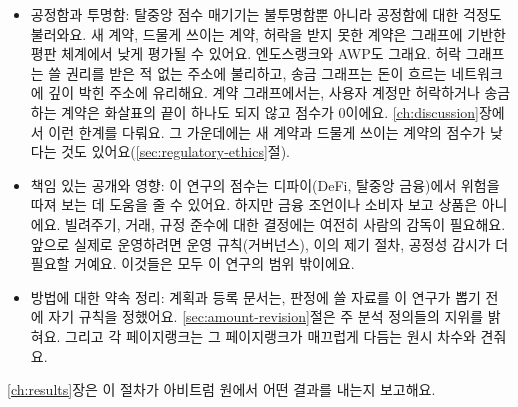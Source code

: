 \begin{itemize}
\item{}\label{sub:fairness-transparency}
  공정함과 투명함: 탈중앙 점수 매기기는 불투명함뿐 아니라 공정함에 대한 걱정도 불러와요\parencite{packin2024credit}. 새 계약, 드물게 쓰이는 계약, 허락을 받지 못한 계약은 그래프에 기반한 평판 체계에서 낮게 평가될 수 있어요. 엔도스랭크와 AWP도 그래요. 허락 그래프는 쓸 권리를 받은 적 없는 주소에 불리하고, 송금 그래프는 돈이 흐르는 네트워크에 깊이 박힌 주소에 유리해요. 계약 그래프에서는, 사용자 계정만 허락하거나 송금하는 계약은 화살표의 끝이 하나도 되지 않고 점수가 0이에요. \ref{ch:discussion}장에서 이런 한계를 다뤄요. 그 가운데에는 새 계약과 드물게 쓰이는 계약의 점수가 낮다는 것도 있어요(\ref{sec:regulatory-ethics}절).

\item{}\label{sub:responsible-disclosure}
  책임 있는 공개와 영향: 이 연구의 점수는 디파이(DeFi, 탈중앙 금융)에서 위험을 따져 보는 데 도움을 줄 수 있어요. 하지만 금융 조언이나 소비자 보고 상품은 아니에요. 빌려주기, 거래, 규정 준수에 대한 결정에는 여전히 사람의 감독이 필요해요. 앞으로 실제로 운영하려면 운영 규칙(거버넌스), 이의 제기 절차, 공정성 감시가 더 필요할 거예요. 이것들은 모두 이 연구의 범위 밖이에요.

\item{}\label{sub:methodological-commitments}
  방법에 대한 약속 정리: 계획과 등록 문서는, 판정에 쓸 자료를 이 연구가 뽑기 전에 자기 규칙을 정했어요. \ref{sec:amount-revision}절은 주 분석 정의들의 지위를 밝혀요. 그리고 각 페이지랭크는 그 페이지랭크가 매끄럽게 다듬는 원시 차수와 견줘요.
\end{itemize}

\ref{ch:results}장은 이 절차가 아비트럼 원에서 어떤 결과를 내는지 보고해요.

